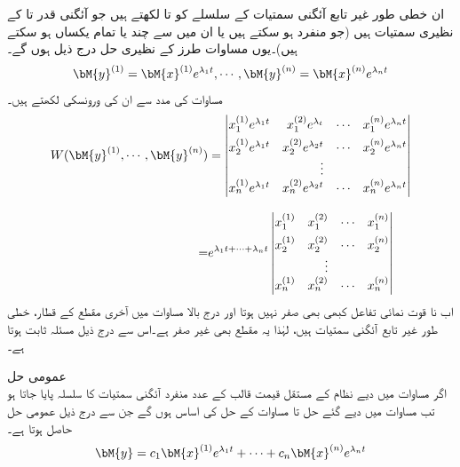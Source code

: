 ان خطی طور غیر تابع آئگنی سمتیات کے سلسلے کو  تا  لکھتے ہیں جو آئگنی قدر  تا  کے نظیری سمتیات ہیں (جو منفرد ہو سکتے ہیں یا ان میں سے چند یا تمام یکساں ہو سکتے ہیں)۔یوں مساوات  طرز کے نظیری حل درج ذیل ہوں  گے۔
\begin{align}\label{مساوات_نظام_مستقل_عددی_سر_نظام_ت}
\bM{y}^{(1)}=\bM{x}^{(1)}e^{\lambda_1 t}, \cdots, \bM{y}^{(n)}=\bM{x}^{(n)}e^{\lambda_n t}
\end{align}
مساوات  کی مدد سے ان کی ورونسکی  لکھتے ہیں۔
\begin{gather}\label{مساوات_نظام_مستقل_عددی_سر_نظام_ٹ}
\begin{aligned}
W(\bM{y}^{(1)},\cdots,\bM{y}^{(n)})&=
\begin{vmatrix*}[r]
x_1^{(1)} e^{\lambda_1 t}& x_1^{(2)} e^{\lambda_ t} &\cdots&x_1^{(n)} e^{\lambda_n t}\\[1ex]
x_2^{(1)} e^{\lambda_1 t}& x_2^{(2)} e^{\lambda_2 t} &\cdots&x_2^{(n)} e^{\lambda_n t}\\
& \vdots & &\\
x_n^{(1)} e^{\lambda_1 t}& x_n^{(2)}  e^{\lambda_2 t}&\cdots&x_n^{(n)} e^{\lambda_n t}
\end{vmatrix*}\\[2ex]
=&e^{\lambda_1t+ \cdots+\lambda_n t}
\begin{vmatrix*}[r]
x_1^{(1)}& x_1^{(2)} &\cdots&x_1^{(n)} \\[1ex]
x_2^{(1)} & x_2^{(2)}  &\cdots&x_2^{(n)} \\
& \vdots & &\\
x_n^{(1)} & x_n^{(2)} &\cdots&x_n^{(n)} 
\end{vmatrix*}
\end{aligned}
\end{gather}
اب نا قوت نمائی تفاعل کبھی بھی صفر نہیں ہوتا اور درج بالا مساوات میں آخری مقطع کے قطار، خطی طور غیر تابع آئگنی سمتیات ہیں، لہٰذا یہ مقطع بھی غیر صفر ہے۔اس سے درج ذیل مسئلہ ثابت ہوتا ہے۔

\quad عمومی حل\\
اگر  مساوات  میں دیے نظام کے مستقل قیمت قالب  کے  عدد منفرد آئگنی سمتیات کا سلسلہ پایا جاتا ہو تب مساوات  میں دیے گئے حل  تا  مساوات  کے حل کی اساس ہوں گے جن سے درج ذیل عمومی حل حاصل ہوتا ہے۔
\begin{align}
\bM{y}=c_1\bM{x}^{(1)}e^{\lambda_1 t}+\cdots+c_n\bM{x}^{(n)}e^{\lambda_n t}
\end{align} 

